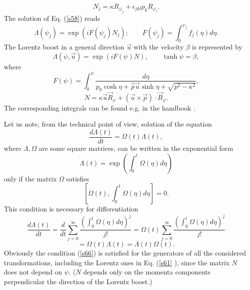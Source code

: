 \documentclass[a4paper,a4paper]{article}
\begin{document}
\begin{equation}
N_{j}=\kappa R_{\varphi _{j}}+\epsilon _{jkl}p_{k}R_{\varphi _{l}}.
\label{sa59}
\end{equation}%
The solution of Eq. (\ref{s58}) reads 
\begin{equation}
\Lambda (\psi _{j})=\exp \left( iF(\psi _{j})N_{j}\right) ;\qquad F(\psi
_{j})=\int_{0}^{\psi _{j}}f_{j}(\eta )d\eta .  \label{s60}
\end{equation}%
The Lorentz boost in a general direction $\vec{u}$ with the velocity $\beta $
is represented by 
\begin{equation}
\Lambda (\psi ,\vec{u})=\exp \left( iF(\psi )N\right) ,\qquad \tanh \psi
=\beta ,  \label{s61}
\end{equation}%
where 
\begin{equation}
F(\psi )=\int_{0}^{\psi }\frac{d\eta }{p_{0}\cosh \eta +\vec{p}\vec{u}\sinh
\eta +\sqrt{p^{2}-\kappa ^{2}}},  \label{s62}
\end{equation}%
\begin{equation}
N=\kappa \vec{u}\vec{R}_{\varphi }+\left( \vec{u}\times \vec{p}\right) \cdot 
\vec{R}_{\varphi }.  \label{sa62}
\end{equation}%
The corresponding integrals can be found e.g. in the handbook \cite{pru}.

Let us note, from the technical point of view, solution of the equation 
\begin{equation}
\frac{d\Lambda (t)}{dt}=\Omega (t)\Lambda (t),  \label{s63}
\end{equation}%
where $\Lambda ,\Omega $ are some square matrices, can be written in the
exponential form 
\begin{equation}
\Lambda (t)=\exp \left( \int_{0}^{t}\Omega (\eta )d\eta \right)  \label{s64}
\end{equation}%
only if the matrix $\Omega $ satisfies 
\begin{equation}
\left[ \Omega (t),\int_{0}^{t}\Omega (\eta )d\eta \right] =0.  \label{s65}
\end{equation}%
This condition is necessary for differentiation 
\begin{equation}
\frac{d\Lambda (t)}{dt}=\frac{d}{dt}\sum_{j=0}^{\infty }\frac{\left(
\int_{0}^{t}\Omega (\eta )d\eta \right) ^{j}}{j!}=\Omega
(t)\sum_{j=0}^{\infty }\frac{\left( \int_{0}^{t}\Omega (\eta )d\eta \right)
^{j}}{j!}  \label{s66}
\end{equation}%
\begin{equation*}
=\Omega (t)\Lambda (t)=\Lambda (t)\Omega (t).
\end{equation*}%
Obviously the condition (\ref{s66}) is satisfied for the generators of all
the considered transformations, including the Lorentz ones in Eq. (\ref{s61}%
), since the matrix $N$ does not depend on $\psi $. ($N$ depends only on the
momenta components perpendicular the direction of the Lorentz boost.)
\end{document}
